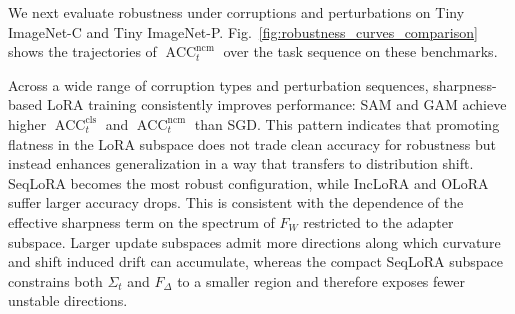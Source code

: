 \documentclass{article}
\theoremstyle{plain}
\theoremstyle{definition}
\theoremstyle{remark}
\begin{document}
We next evaluate robustness under corruptions and perturbations on Tiny ImageNet-C and Tiny ImageNet-P. Fig.~\ref{fig:robustness_curves_comparison} shows the trajectories of $\operatorname{ACC}_t^{\mathrm{ncm}}$ over the task sequence on these benchmarks. 


Across a wide range of corruption types and perturbation sequences, sharpness-based LoRA training consistently improves performance: SAM and GAM achieve higher $\operatorname{ACC}_t^{\mathrm{cls}}$ and $\operatorname{ACC}_t^{\mathrm{ncm}}$ than SGD. This pattern indicates that promoting flatness in the LoRA subspace does not trade clean accuracy for robustness but instead enhances generalization in a way that transfers to distribution shift. SeqLoRA becomes the most robust configuration, while IncLoRA and OLoRA suffer larger accuracy drops. This is consistent with the dependence of the effective sharpness term on the spectrum of $F_W$ restricted to the adapter subspace. Larger update subspaces admit more directions along which curvature and shift induced drift can accumulate, whereas the compact SeqLoRA subspace constrains both $\Sigma_t$ and $F_\Delta$ to a smaller region and therefore exposes fewer unstable directions.


    
\end{document}
